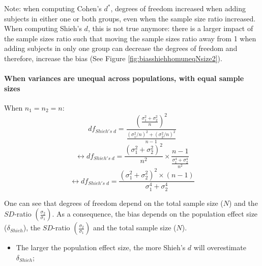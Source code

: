 \documentclass[
  english,
  man,mask]{apa6}
\providecommand{\tightlist}{%
  \setlength{\itemsep}{0pt}\setlength{\parskip}{0pt}}
\let\oldparagraph\paragraph
\renewcommand{\paragraph}[1]{\oldparagraph{#1}\mbox{}}
\begin{document}
Note: when computing Cohen's \(d^*\), degrees of freedom increased when adding subjects in either one or both groups, even when the sample size ratio increased. When computing Shieh's \(d\), this is not true anymore: there is a larger impact of the sample sizes ratio such that moving the sample sizes ratio away from 1 when adding subjects in only one group can decrease the degrees of freedom and therefore, increase the bias (See Figure \ref{fig:biasshiehhomuneqNsize2}).

\hypertarget{when-variances-are-unequal-across-populations-with-equal-sample-sizes-1}{%
\paragraph{When variances are unequal across populations, with equal sample sizes}\label{when-variances-are-unequal-across-populations-with-equal-sample-sizes-1}}

When \(n_1=n_2=n\):
\[df_{Shieh's \; d} = \frac{\left( \frac{\sigma_1^2+\sigma_2^2}{n} \right)^2}{\frac{(\sigma_1^2/n)^2+(\sigma_2^2/n)^2}{n-1}}\]
\[\leftrightarrow df_{Shieh's \; d} = \frac{(\sigma_1^2+\sigma_2^2)^2}{n^2} \times\frac{n-1}{\frac{\sigma_1^4+\sigma_2^4}{n^2}}\]
\[\leftrightarrow df_{Shieh's \; d} = \frac{(\sigma_1^2+\sigma_2^2)^2 \times (n-1)}{\sigma_1^4+\sigma_2^4}\]

One can see that degrees of freedom depend on the total sample size (\(N\)) and the \(SD\)-ratio \(\left( \frac{\sigma_2}{\sigma_1}\right)\). As a consequence, the bias depends on the population effect size (\(\delta_{Shieh}\)), the \(SD\)-ratio \(\left( \frac{\sigma_2}{\sigma_1}\right)\) and the total sample size (\(N\)).

\begin{itemize}
\tightlist
\item
  The larger the population effect size, the more Shieh's \(d\) will overestimate \(\delta_{Shieh}\);
\end{itemize}
\end{document}

